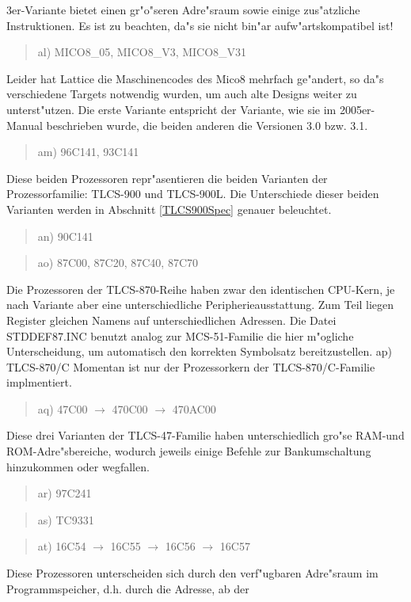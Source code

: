 \documentclass[12pt,a4paper,twoside]{report}
\begin{document}
3er-Variante bietet einen gr"o"seren Adre"sraum sowie einige zus"atzliche
Instruktionen.  Es ist zu beachten, da"s sie nicht bin"ar
aufw"artskompatibel ist!
\begin{quote}
al) MICO8\_05, MICO8\_V3, MICO8\_V31
\end{quote}
Leider hat Lattice die Maschinencodes des Mico8 mehrfach ge"andert, so
da"s verschiedene Targets notwendig wurden, um auch alte Designs weiter
zu unterst"utzen.  Die erste Variante entspricht der Variante, wie sie
im 2005er-Manual beschrieben wurde, die beiden anderen die Versionen 3.0
bzw. 3.1.
\begin{quote}
am) 96C141, 93C141
\end{quote}
Diese beiden Prozessoren repr"asentieren die beiden Varianten der
Prozessorfamilie: TLCS-900 und TLCS-900L.  Die Unterschiede dieser beiden
Varianten werden in Abschnitt \ref{TLCS900Spec} genauer beleuchtet.
\begin{quote}
an) 90C141
\end{quote}
\begin{quote}
ao) 87C00, 87C20, 87C40, 87C70
\end{quote}
Die Prozessoren der TLCS-870-Reihe haben zwar den identischen CPU-Kern, je
nach Variante aber eine unterschiedliche Peripherieausstattung.  Zum
Teil liegen Register gleichen Namens auf unterschiedlichen Adressen.
Die Datei STDDEF87.INC benutzt analog zur MCS-51-Familie die hier
m"ogliche Unterscheidung, um automatisch den korrekten Symbolsatz
bereitzustellen.
ap) TLCS-870/C
Momentan ist nur der Prozessorkern der TLCS-870/C-Familie implmentiert.
\begin{quote}
aq) 47C00 $\rightarrow$ 470C00 $\rightarrow$ 470AC00
\end{quote}
Diese drei Varianten der TLCS-47-Familie haben unterschiedlich gro"se
RAM-und ROM-Adre"sbereiche, wodurch jeweils einige Befehle zur
Bankumschaltung hinzukommen oder wegfallen.
\begin{quote}
ar) 97C241
\end{quote}
\begin{quote}
as) TC9331
\end{quote}
\begin{quote}
at) 16C54 $\rightarrow$ 16C55 $\rightarrow$ 16C56 $\rightarrow$ 16C57
\end{quote}
Diese Prozessoren unterscheiden sich durch den verf"ugbaren
Adre"sraum im Programmspeicher, d.h. durch die Adresse, ab der
\end{document}
